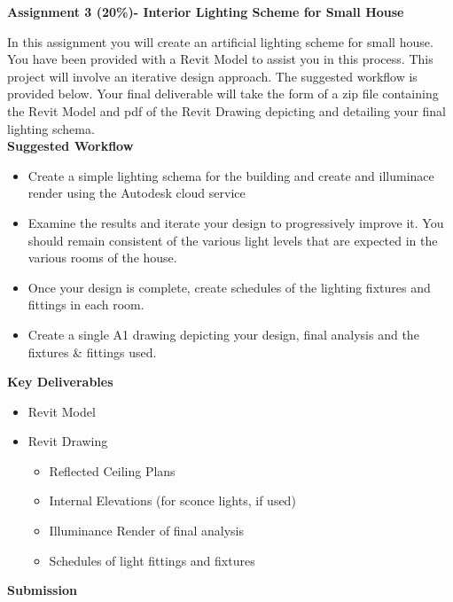 
	
\begin{flushleft}
\Large\textbf{Assignment 3 (20\%)- Interior Lighting Scheme for Small House}\\
\end{flushleft}

In this assignment you will create an artificial lighting scheme for small house.  You have been provided with a Revit Model to assist you in this process.  This project will involve an iterative design approach.  The suggested workflow is provided below.  Your final deliverable will take the form of a zip file containing the Revit Model and pdf of the Revit Drawing depicting and detailing your final lighting schema. \\

\textbf{Suggested Workflow}

\begin{itemize}
	\item Create a simple lighting schema for the building and create and illuminace render using the Autodesk cloud service
	\item Examine the results and iterate your design to progressively improve it.  You should remain consistent of the various light levels that are expected in the various rooms of the house.
	\item Once your design is complete, create schedules of the lighting fixtures and fittings in each room. 
	\item Create a single A1 drawing depicting your design, final analysis and the fixtures \& fittings used. 
\end{itemize}

\textbf{Key Deliverables}

\begin{itemize}
	\item Revit Model
	\item Revit Drawing
		\begin{itemize}
			\item Reflected Ceiling Plans
			\item Internal Elevations (for sconce lights, if used)
			\item Illuminance Render of final analysis
			\item Schedules of light fittings and fixtures
		\end{itemize}
\end{itemize}

\textbf{Submission}

